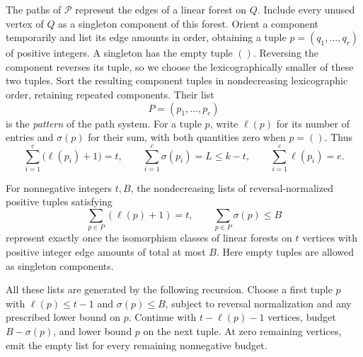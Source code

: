 The paths of $\mathcal P$ represent the edges of a linear forest on
$Q$.  Include every unused vertex of $Q$ as a singleton component of
this forest.  Orient a component temporarily and list its edge amounts
in order, obtaining a tuple $p=(q_1,\ldots,q_r)$ of positive integers.
A singleton has the empty tuple $()$.  Reversing the component reverses
its tuple, so we choose the lexicographically smaller of these two
tuples.  Sort the resulting component tuples in nondecreasing
lexicographic order, retaining repeated components.  Their list
\[
 P=(p_1,\ldots,p_c)
\]
is the \emph{pattern} of the path system.  For a tuple $p$, write
$\ell(p)$ for its number of entries and $\sigma(p)$ for their sum,
with both quantities zero when $p=()$.  Thus
\begin{equation}\label{finite:pattern-parameters}
 \sum_{i=1}^c\bigl(\ell(p_i)+1\bigr)=t,\qquad
 \sum_{i=1}^c\sigma(p_i)=L\le k-t,\qquad
 \sum_{i=1}^c\ell(p_i)=e.
\end{equation}

\begin{lemma}\label{finite:coverage}
For nonnegative integers $t,B$, the nondecreasing lists of
reversal-normalized positive tuples satisfying
\[
 \sum_{p\in P}(\ell(p)+1)=t,
 \qquad \sum_{p\in P}\sigma(p)\le B
\]
represent exactly once the isomorphism classes of linear forests on
$t$ vertices with positive integer edge amounts of total at most $B$.
Here empty tuples are allowed as singleton components.

All these lists are generated by the following recursion.  Choose a
first tuple $p$ with $\ell(p)\le t-1$ and $\sigma(p)\le B$, subject
to reversal normalization and any prescribed lower bound on $p$.
Continue with $t-\ell(p)-1$ vertices, budget $B-\sigma(p)$, and
lower bound $p$ on the next tuple.  At zero remaining vertices, emit
the empty list for every remaining nonnegative budget.
\end{lemma}

